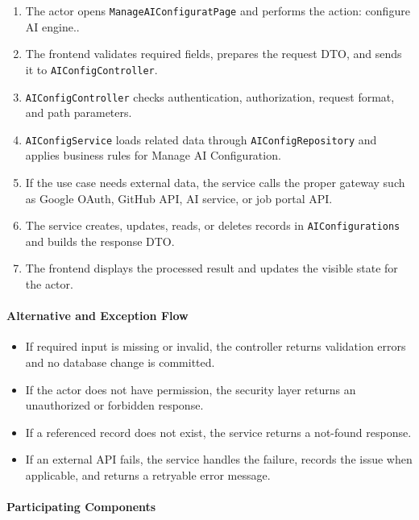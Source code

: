 \begin{enumerate}
    \item The actor opens \texttt{ManageAIConfiguratPage} and performs the action: configure AI engine..
    \item The frontend validates required fields, prepares the request DTO, and sends it to \texttt{AIConfigController}.
    \item \texttt{AIConfigController} checks authentication, authorization, request format, and path parameters.
    \item \texttt{AIConfigService} loads related data through \texttt{AIConfigRepository} and applies business rules for Manage AI Configuration.
    \item If the use case needs external data, the service calls the proper gateway such as Google OAuth, GitHub API, AI service, or job portal API.
    \item The service creates, updates, reads, or deletes records in \texttt{AIConfigurations} and builds the response DTO.
    \item The frontend displays the processed result and updates the visible state for the actor.
\end{enumerate}

\paragraph{Alternative and Exception Flow}

\begin{itemize}
    \item If required input is missing or invalid, the controller returns validation errors and no database change is committed.
    \item If the actor does not have permission, the security layer returns an unauthorized or forbidden response.
    \item If a referenced record does not exist, the service returns a not-found response.
    \item If an external API fails, the service handles the failure, records the issue when applicable, and returns a retryable error message.
\end{itemize}

\paragraph{Participating Components}

